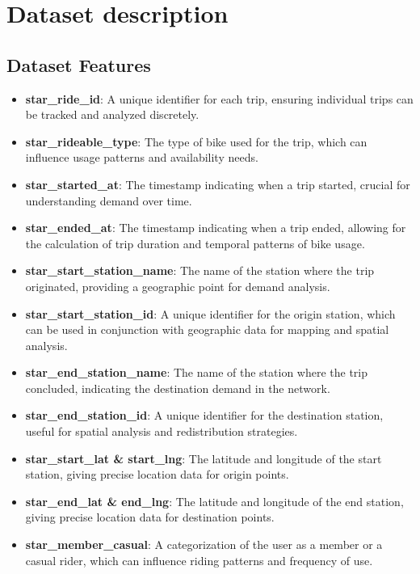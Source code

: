 \documentclass[12pt, a4paper]{article}
\begin{document}
    \section*{Dataset description}
    \label{sec:dataset}

    \subsection{Dataset Features}\label{subsec:dataset-features}
    \begin{itemize}
        \item \textbf{star\_ride\_id}: A unique identifier for each trip, ensuring individual trips can be tracked and analyzed discretely.
        \item \textbf{star\_rideable\_type}: The type of bike used for the trip, which can influence usage patterns and availability needs.
        \item \textbf{star\_started\_at}: The timestamp indicating when a trip started, crucial for understanding demand over time.
        \item \textbf{star\_ended\_at}: The timestamp indicating when a trip ended, allowing for the calculation of trip duration and temporal patterns of bike usage.
        \item \textbf{star\_start\_station\_name}: The name of the station where the trip originated, providing a geographic point for demand analysis.
        \item \textbf{star\_start\_station\_id}: A unique identifier for the origin station, which can be used in conjunction with geographic data for mapping and spatial analysis.
        \item \textbf{star\_end\_station\_name}: The name of the station where the trip concluded, indicating the destination demand in the network.
        \item \textbf{star\_end\_station\_id}: A unique identifier for the destination station, useful for spatial analysis and redistribution strategies.
        \item \textbf{star\_start\_lat \& start\_lng}: The latitude and longitude of the start station, giving precise location data for origin points.
        \item \textbf{star\_end\_lat \& end\_lng}: The latitude and longitude of the end station, giving precise location data for destination points.
        \item \textbf{star\_member\_casual}: A categorization of the user as a member or a casual rider, which can influence riding patterns and frequency of use.
    \end{itemize}
\end{document}
